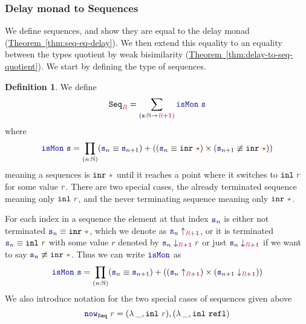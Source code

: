 \documentclass[twoside,11pt,openright]{report}
\theoremstyle{plain} %
\theoremstyle{definition}
\newtheorem{defn}[thm]{Definition}%
\theoremstyle{remark}
\newcommand*{\thmref}[1]{\hyperref[thm:#1]{Theorem~\ref*{thm:#1}}} %
\newcommand*{\term}[1]{\textcolor{green!30!black}{#1}} %
\newcommand*{\type}[1]{\textcolor{magenta!90!black}{#1}}
\newcommand*{\unit}{\type{\textbf{1}}}
\newcommand*{\constant}[1]{\textcolor{orange!60!black}{\ensuremath{\mathtt{#1}}}}
\newcommand*{\function}[1]{\textcolor{blue!60!black}{\ensuremath{\mathtt{#1}}}}
\newcommand*{\typeformer}[1]{\ensuremath{\mathtt{#1}}}
\newcommand*{\unitelem}{\constant{\star}} %
\begin{document}
\subsubsection{Delay monad to Sequences}
We define sequences, and show they are equal to the delay monad (\thmref{seq-eq-delay}). We then extend this equality to an equality between the types quotient by weak bisimilarity (\thmref{delay-to-seq-quotient}). We start by defining the type of sequences.
\label{sec:delay-monad-to-sequences}
\begin{defn}
  We define
  \begin{equation}
    \typeformer{Seq}_{\type{R}} = \sum_{(\function{s} : \mathbb{N} \rightarrow \type{R} + \unit)} \function{isMon}~\function{s}
  \end{equation}
  where
  \begin{equation}
    \function{isMon}~\function{s} = \prod_{(n : \mathbb{N})} (\function{s}_n \equiv \function{s}_{n+1})  + ((\function{s}_n \equiv \mathtt{inr}~\unitelem) \times (\function{s}_{n+1} \not\equiv \mathtt{inr}~\unitelem))
  \end{equation}
  meaning a sequences is \(\mathtt{inr}~\unitelem\) until it reaches a point where it switches to \(\mathtt{inl}~\term{r}\) for some value \(\term{r}\). There are two special cases, the already terminated sequence meaning only \(\mathtt{inl}~\term{r}\), and the never terminating sequence meaning only \(\mathtt{inr}~\unitelem\).
\end{defn}
\noindent For each index in a sequence the element at that index \(\function{s}_n\) is either not terminated \(\function{s}_n \equiv \mathtt{inr}~\unitelem\), which we denote as \(\function{s}_n \uparrow_{\type{R} + \unit}\), or it is terminated \(\function{s}_n \equiv \mathtt{inl}~\term{r}\) with some value \(r\) denoted by \(\function{s}_n \downarrow_{\type{R} + \unit} \term{r}\) or just \(\function{s}_n \downarrow_{\type{R} + \unit}\) if we want to say \(\function{s}_n \not\equiv \mathtt{inr}~\unitelem\). Thus we can write \(\function{isMon}\) as
\begin{equation}
  \function{isMon}~\function{s} = \prod_{(n : \mathbb{N})} (\function{s}_n \equiv \function{s}_{n+1})  + ((\function{s}_n \uparrow_{\type{R} + \unit}) \times (\function{s}_{n+1} \downarrow_{\type{R} + \unit}))
\end{equation}
We also introduce notation for the two special cases of sequences given above
\begin{equation}
  \function{now}_{\typeformer{Seq}}~\term{r} = (\lambda\,\_, \mathtt{inl}~\term{r}) , (\lambda\,\_, \mathtt{inl}~\mathtt{refl})
\end{equation}
\end{document}
